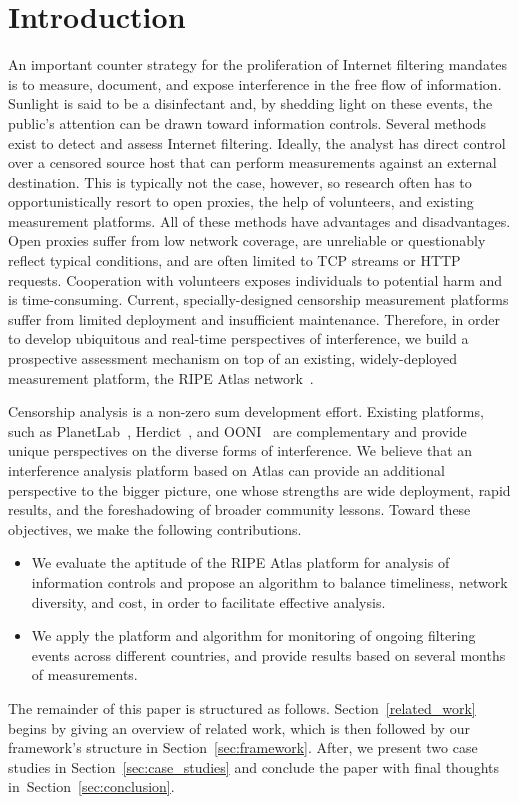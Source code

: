 \section{Introduction}

An important counter strategy for the proliferation of Internet filtering mandates is to
measure, document, and expose interference in the free flow of information.  Sunlight is said to be a
disinfectant and, by shedding light on these events, the public's attention can
be drawn toward information controls.  Several methods exist to detect and assess
Internet filtering.  Ideally, the analyst has direct control over a censored
source host that can perform measurements against an external destination.
This is typically not the case, however, so research often has to
opportunistically resort to open proxies, the help of volunteers, and existing
measurement platforms.  All of these methods have advantages and disadvantages.
Open proxies suffer from low network coverage, are unreliable or questionably
reflect typical conditions, and are often limited to TCP streams or HTTP
requests.  Cooperation with volunteers exposes individuals to potential harm
and is time-consuming. Current, specially-designed censorship measurement
platforms suffer from limited deployment and insufficient maintenance.
Therefore, in order to develop ubiquitous and real-time perspectives of
interference, we build a prospective assessment mechanism on top of an existing,
widely-deployed measurement platform, the RIPE Atlas network~\cite{atlas}.

Censorship analysis is a non-zero sum development effort.
Existing platforms, such as PlanetLab~\cite{planetlab}, Herdict~\cite{Herdict},
and OONI~\cite{Filasto2012} are complementary and provide unique perspectives
on the diverse forms of interference.  We believe that an interference analysis
platform based on Atlas can provide an additional perspective to the bigger
picture, one whose strengths are wide deployment, rapid results, and the
foreshadowing of broader community lessons.  Toward these objectives, we make the
following contributions.

\begin{itemize}
	\item We evaluate the aptitude of the RIPE Atlas platform for
		analysis of information controls and propose an algorithm to balance timeliness, network
		diversity, and cost, in order to facilitate effective analysis.
	\item We apply the platform and algorithm for monitoring of ongoing
		filtering events across different countries, and provide results based
		on several months of measurements.
\end{itemize}

The remainder of this paper is structured as follows.
Section~\ref{related_work} begins by giving an overview of related work, which
is then followed by our framework's structure in
Section~\ref{sec:framework}. After, we present two case studies in
Section~\ref{sec:case_studies} and conclude the paper with final thoughts
in~Section~\ref{sec:conclusion}.
